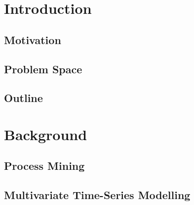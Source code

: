 \documentclass[12pt,a4paper]{report}
\begin{document}




\tableofcontents
\printglossary[type=acronym, title=List of terms, toctitle=List of terms]


\chapter{Introduction}
\label{sec:intro}

\section{Motivation}
\label{sec:motivation}


\section{Problem Space}
\label{sec:challenges}


\section{Outline}
\label{sec:approaches}



\chapter{Background}
\label{ch:prereq}

\section{Process Mining}
\label{sec:process}


\section{Multivariate Time-Series Modelling}
\label{sec:sequences}

\end{document}
